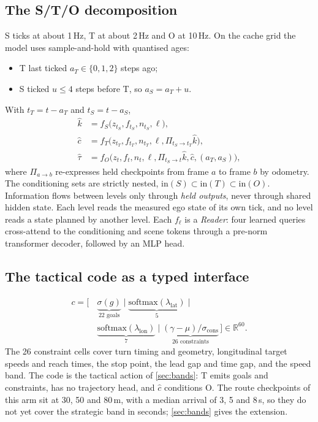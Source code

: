 \documentclass[10pt,twocolumn]{article}
\theoremstyle{remark}
\newcommand{\Rset}{\mathbb{R}}
\begin{document}
\subsection{The S/T/O decomposition}
S ticks at about 1\,Hz, T at about 2\,Hz and O at 10\,Hz. On the cache grid the model uses sample-and-hold with quantised ages:
\begin{itemize}
  \item T last ticked $a_T\in\{0,1,2\}$ steps ago;
  \item S ticked $u\le4$ steps before T, so $a_S=a_T+u$.
\end{itemize}
With $t_T=t-a_T$ and $t_S=t-a_S$,
\begin{equation}
\begin{aligned}
\hat k&=f_S\big(z_{t_S},f_{t_S},n_{t_S},\ell\big),\\
\hat c&=f_T\big(z_{t_T},f_{t_T},n_{t_T},\ell,\Pi_{t_S\to t_T}\hat k\big),\\
\hat\tau&=f_O\big(z_t,f_t,n_t,\ell,\Pi_{t_S\to t}\hat k,\hat c,(a_T,a_S)\big),
\end{aligned}
\end{equation}
where $\Pi_{a\to b}$ re-expresses held checkpoints from frame $a$ to frame $b$ by odometry. The conditioning sets are strictly nested,
$\mathrm{in}(S)\subset\mathrm{in}(T)\subset\mathrm{in}(O)$. Information flows between levels only through \emph{held outputs}, never
through shared hidden state. Each level reads the measured ego state of its own tick, and no level reads a state planned by another
level. Each $f_\ell$ is a \emph{Reader}: four learned queries cross-attend to the conditioning and scene tokens
through a pre-norm transformer decoder, followed by an MLP head.

\subsection{The tactical code as a typed interface}
\begin{equation}
\begin{aligned}
c=\big[\,&\underbrace{\sigma(g)}_{22\text{ goals}}\;\big|\;\underbrace{\mathrm{softmax}(\lambda_{\mathrm{lat}})}_{5}\;\big|\\
&\underbrace{\mathrm{softmax}(\lambda_{\mathrm{lon}})}_{7}\;\big|\;\underbrace{(\gamma-\mu)/\sigma_{\mathrm{cons}}}_{26\text{ constraints}}\,\big]\in\Rset^{60}.
\end{aligned}
\end{equation}
The 26 constraint cells cover turn timing and geometry, longitudinal target speeds and reach times, the stop point, the lead gap and
time gap, and the speed band. The code is the tactical action of \cref{sec:bands}: T emits goals and constraints, has no trajectory
head, and $\hat c$ conditions O. The route checkpoints of this arm sit at 30, 50 and 80\,m, with a median arrival of 3, 5 and 8\,s, so
they do not yet cover the strategic band in seconds; \cref{sec:bands} gives the extension.
\end{document}
